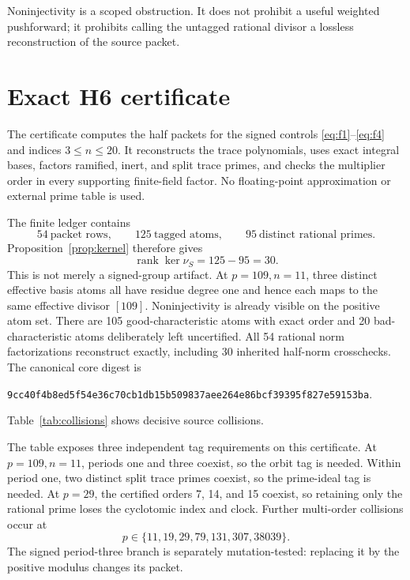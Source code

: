 \documentclass[11pt]{article}
\theoremstyle{definition}\newtheorem{definition}[theorem]{Definition}
\theoremstyle{remark}\newtheorem{remark}[theorem]{Remark}
\begin{document}
Noninjectivity is a scoped obstruction.  It does not prohibit a useful
weighted pushforward; it prohibits calling the untagged rational divisor a
lossless reconstruction of the source packet.

\section{Exact H6 certificate}

The certificate computes the half packets for the signed controls
\eqref{eq:f1}--\eqref{eq:f4} and indices $3\le n\le20$.  It reconstructs the
trace polynomials, uses exact integral bases, factors ramified, inert, and
split trace primes, and checks the multiplier order in every supporting
finite-field factor.  No floating-point approximation or external prime
table is used.

The finite ledger contains
\[
54\ \text{packet rows},\qquad
125\ \text{tagged atoms},\qquad
95\ \text{distinct rational primes}.
\]
Proposition~\ref{prop:kernel} therefore gives
\[
\operatorname{rank}\ker\nu_S=125-95=30.
\]
This is not merely a signed-group artifact.  At $p=109,n=11$, three distinct
effective basis atoms all have residue degree one and hence each maps to the
same effective divisor $[109]$.  Noninjectivity is already visible on the
positive atom set.
There are 105 good-characteristic atoms with exact order and 20
bad-characteristic atoms deliberately left uncertified.  All 54 rational
norm factorizations reconstruct exactly, including 30 inherited half-norm
crosschecks.  The canonical core digest is
\begin{center}
\small\texttt{9cc40f4b8ed5f54e36c70cb1db15b509837aee264e86bcf39395f827e59153ba}.
\end{center}

Table~\ref{tab:collisions} shows decisive source collisions.

\begin{table}[t]
\centering
\caption{Selected tagged atoms.  The order column is the exact multiplier
residue order; all displayed rows are good characteristic.}
\label{tab:collisions}
\small
\resizebox{\textwidth}{!}{}
\end{table}

The table exposes three independent tag requirements on this certificate.
At $p=109,n=11$, periods one and three coexist, so the orbit tag is needed.
Within period one, two distinct split trace primes coexist, so the
prime-ideal tag is needed.  At $p=29$, the certified orders 7, 14, and 15
coexist, so retaining only the rational prime loses the cyclotomic index and
clock.  Further multi-order collisions occur at
\[
p\in\{11,19,29,79,131,307,38039\}.
\]
The signed period-three branch is separately mutation-tested: replacing it
by the positive modulus changes its packet.
\end{document}
